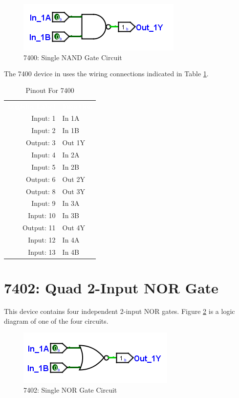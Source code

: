 \begin{figure}[H]
	\centering
	\includegraphics{gfx/50-7400}
	\caption{7400: Single NAND Gate Circuit}
	\label{fig:50-7400}
\end{figure}

The 7400 device in \LE uses the wiring connections indicated in Table \ref{tab:50-7400}.

\begin{table}[H]
	\sffamily
	\newcommand{\head}[1]{\textcolor{white}{\textbf{#1}}}		
	\begin{center}
		\begin{tabular}{rl} 
			\rowcolor{black!75}
			\head{Logisim Label} & \head{Function} \\
			Input: 1   & In 1A  \\
			Input: 2   & In 1B  \\
			Output: 3  & Out 1Y \\
			Input: 4   & In 2A  \\
			Input: 5   & In 2B  \\
			Output: 6  & Out 2Y \\
			Output: 8  & Out 3Y \\
			Input: 9   & In 3A  \\
			Input: 10  & In 3B  \\
			Output: 11 & Out 4Y \\
			Input: 12  & In 4A  \\
			Input: 13  & In 4B  \\
		\end{tabular}
	\end{center}
	\caption{Pinout For 7400}
	\label{tab:50-7400}
\end{table}

\section{7402: Quad 2-Input NOR Gate}

This device contains four independent 2-input NOR gates. Figure \ref{fig:50-7402} is a logic diagram of one of the four circuits.

\begin{figure}[H]
	\centering
	\includegraphics{gfx/50-7402}
	\caption{7402: Single NOR Gate Circuit}
	\label{fig:50-7402}
\end{figure}

